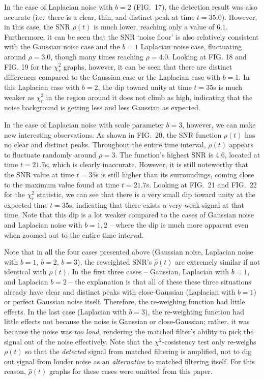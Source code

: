 \documentclass[preprint,
letterpaper,
 amsmath,amssymb,
 aps,
]{revtex4-2}
\begin{document}
In the case of Laplacian noise with $b=2$ (FIG.\ 17), the detection result was also accurate (i.e.\ there is a clear, thin, and distinct peak at time $t=35.0$). However, in this case, the SNR $\rho(t)$ is much lower, reaching only a value of $6.1$. Furthermore, it can be seen that the SNR `noise floor' is also relatively consistent with the Gaussian noise case and the $b=1$ Laplacian noise case, fluctuating around $\rho = 3.0$, though many times reaching $\rho = 4.0$. Looking at FIG. 18 and FIG. 19 for the $\chi_r^2$ graphs, however, it can be seen that there are distinct differences compared to the Gaussian case or the Laplacian case with $b=1$. In this Laplacian case with $b=2$, the dip toward unity at time $t=35$s is much weaker as $\chi^2_r$ in the region around it does not climb as high, indicating that the noise background is getting less and less Gaussian as expected. 

In the case of Laplacian noise with scale parameter $b=3$, however, we can make new interesting observations. As shown in FIG.\ 20, the SNR function $\rho(t)$ has no clear and distinct peaks. Throughout the entire time interval, $\rho(t)$ appears to fluctuate randomly around $\rho = 3$. The function's highest SNR is 4.6, located at time $t=21.7$s, which is clearly inaccurate. However, it is still noteworthy that the SNR value at time $t=35$s is still higher than its surroundings, coming close to the maximum value found at time $t=21.7$s. Looking at FIG.\ 21 and FIG.\ 22 for the $\chi_r^2$ statistic, we can see that there is a very small dip toward unity at the expected time $t=35$s, indicating that there exists a very weak signal at that time. Note that this dip is a lot weaker compared to the cases of Gaussian noise and Laplacian noise with $b=1,2$ – where the dip is much more apparent even when zoomed out to the entire time interval.


Note that in all the four cases presented above (Gaussian noise, Laplacian noise with $b=1$, $b=2$, $b=3$), the reweighted SNR's $\hat{\rho}(t)$ are extremely similar if not identical with $\rho(t)$. In the first three cases – Gaussian, Laplacian with $b=1$, and Laplacian $b=2$ – the explanation is that all of these these three situations already have clear and distinct peaks with close-Gaussian (Laplacian with $b=1$) or perfect Gaussian noise itself. Therefore, the re-weighing function had little effects. In the last case (Laplacian with $b=3$), the re-weighting function had little effects not because the noise is Gaussian or close-Gaussian; rather, it was because the noise was \textit{too loud}, rendering the matched filter's ability to pick the signal out of the noise effectively. Note that the $\chi^2$-cosistency test only re-weighs $\rho(t)$ so that the \textit{detected} signal from matched filtering is amplified, not to dig out signal from louder noise as an \textit{alternative} to matched filtering itself. For this reason, $\hat{\rho}(t)$ graphs for these cases were omitted from this paper.
\end{document}
